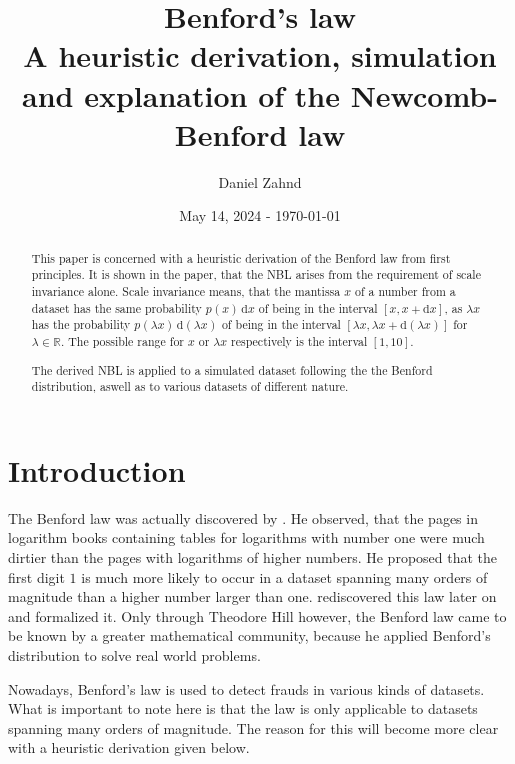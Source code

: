 \documentclass[a4paper,10pt, twocolumn]{article}
\author{Daniel Zahnd}
\date{May 14, 2024 - \today}
\title{Benford's law \\ \vspace{0.5cm} \normalsize A heuristic derivation, simulation and explanation of the Newcomb-Benford law}
\begin{document}
\maketitle


\begin{abstract}
This paper is concerned with a heuristic derivation of the Benford law from first principles. It is shown in the paper, that the NBL arises from the requirement of scale invariance alone. Scale invariance means, that the mantissa $x$ of a number from a dataset has the same probability $p(x)\,\mathrm{d}x$ of being in the interval $[x, x + \mathrm{d}x]$, as $\lambda x$ has the probability $p(\lambda x)\,\mathrm{d}(\lambda x)$ of being in the interval $[\lambda x, \lambda x + \mathrm{d}(\lambda x)]$ for $\lambda \in \mathbb{R}$. The possible range for $x$ or $\lambda x$ respectively is the interval $[1,10]$.

The derived NBL is applied to a simulated dataset following the the Benford distribution, aswell as to various datasets of different nature.
\end{abstract}

\section{Introduction}
The Benford law was actually discovered by \cite{Newcomb1881}. He observed, that the pages in logarithm books containing tables for logarithms with number one were much dirtier than the pages with logarithms of higher numbers. He proposed that the first digit $1$ is much more likely to occur in a dataset spanning many orders of magnitude than a higher number larger than one. \cite{Benford1938} rediscovered this law later on and formalized it. Only through Theodore Hill however, the Benford law came to be known by a greater mathematical community, because he applied Benford's distribution to solve real world problems.

Nowadays, Benford's law is used to detect frauds in various kinds of datasets. What is important to note here is that the law is only applicable to datasets spanning many orders of magnitude. The reason for this will become more clear with a heuristic derivation given below.
\end{document}
